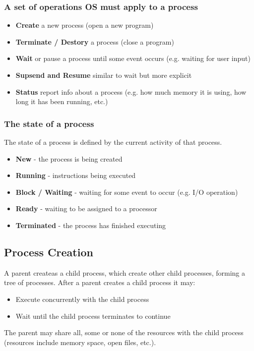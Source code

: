 \documentclass[a4paper, 10pt]{article}
\begin{document}
\subsubsection*{A set of operations OS must apply to a process}
\begin{itemize}
    \item \textbf{Create} a new process (open a new program)
    \item \textbf{Terminate / Destory} a process (close a program)
    \item \textbf{Wait} or pause a process until some event occurs (e.g. waiting for user input)
    \item \textbf{Supsend and Resume} similar to wait but more explicit
    \item \textbf{Status}  report info about a process (e.g. how much memory it is using, how long it has been running, etc.)
\end{itemize}
\subsubsection*{The state of a process}
The state of a process is defined by the current activity of that process.
\begin{itemize}
    \item \textbf{New} - the process is being created
    \item \textbf{Running} - instructions being executed
    \item \textbf{Block / Waiting} - waiting for some event to occur (e.g. I/O operation)
    \item \textbf{Ready} - waiting to be assigned to a processor
    \item \textbf{Terminated} - the process has finished executing
\end{itemize}
\subsection{Process Creation}
A parent createas a child process, which create other child processes, forming a tree of processes. After a parent creates a child process it may:
\begin{itemize}
    \item Execute concurrently with the child process
    \item Wait until the child process terminates to continue
\end{itemize}
The parent may share all, some or none of the resources with the child process (resources include memory space, open files, etc.).
\end{document}
